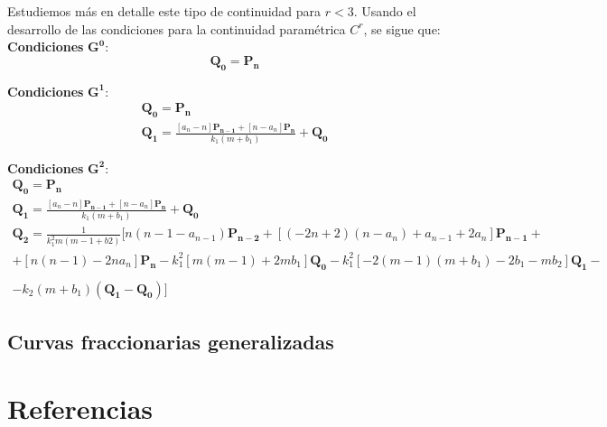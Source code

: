 \documentclass{article}
\begin{document}
Estudiemos más en detalle este tipo de continuidad para $r<3$. Usando el desarrollo de las condiciones para la continuidad paramétrica $C^r$, se sigue que:\\


\textbf{Condiciones} $\mathbf{G^0}$: 
\begin{equation*}
\mathbf{Q_0} = \mathbf{P_n}
\end{equation*}

\textbf{Condiciones} $\mathbf{G^1}$:
\begin{gather*}
\mathbf{Q_0} = \mathbf{P_n} \\
\mathbf{Q_1} = \frac{\left[ a_n - n \right]\mathbf{P_{n-1}} + \left[ n - a_n \right] \mathbf{P_n}}{k_1(m+b_1)} + \mathbf{Q_0}
\end{gather*}

\textbf{Condiciones} $\mathbf{G^2}$:
\begin{gather*}
\mathbf{Q_0} = \mathbf{P_n} \\
\mathbf{Q_1} = \frac{\left[ a_n - n \right]\mathbf{P_{n-1}} + \left[ n - a_n \right] \mathbf{P_n}}{k_1(m+b_1)} + \mathbf{Q_0} \\
\mathbf{Q_2} = \frac{1}{k_1^2m(m-1+b2)} [ n(n-1-a_{n-1})\mathbf{P_{n-2}} + \left[ (-2n+2)(n-a_n) + a_{n-1} + 2a_n \right]\mathbf{P_{n-1}} + \\
+ \left[n(n-1) -2na_n \right]\mathbf{P_n} - k_1^2\left[ m(m-1) + 2mb_1 \right]\mathbf{Q_0} -k_1^2\left[ -2(m-1)(m+b_1) -2b_1 -mb_2 \right]\mathbf{Q_1} - \\
\\ -k_2(m+b_1)(\mathbf{Q_1} - \mathbf{Q_0}) ]
\end{gather*}



\subsection{Curvas fraccionarias generalizadas}



\section{Referencias}
\end{document}
